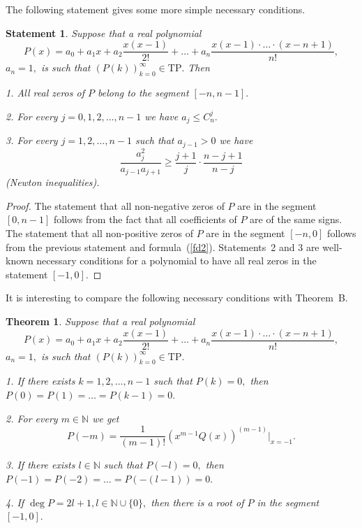 \documentclass[10pt,a4paper]{amsart}
\newcounter{count}
\numberwithin{count}{section}
\newtheorem{Theorem}[count]{Theorem}
\newtheorem{Statement}[count]{Statement}
\begin{document}
The following statement gives some more simple necessary conditions.

\begin{Statement}
\label{st1}
Suppose that a real polynomial 
$$P(x)= a_0 + a_1 x +a_2 \frac{x(x-1)}{2!} 
+  \ldots +a_n \frac{x(x-1)\cdot \ldots \cdot (x-n+1)}{n!},$$
$a_n=1, $   is such that $(P(k))_{k=0}^\infty \in \mathrm{TP}.$ Then

1. All real zeros of $P$ belong to the segment $[- n, n-1].$

2. For every $j=0, 1, 2, \ldots, n-1$ we have $a_j \leq C_n^j.$

3. For every $j= 1, 2, \ldots, n-1$ such that $a_{j-1}>0$  we have
$$\frac{a_j^2}{a_{j-1}a_{j+1}} \geq \frac{j+1}{j} \cdot \frac{n-j+1}{n-j}$$
(Newton inequalities).

\end{Statement}

\begin{proof}

The statement that all non-negative zeros of $P$ are in the segment $[0, n-1]$
follows from the fact that all coefficients of $P$ are of the same signs.
The statement that all non-positive zeros of $P$ are in the segment $[-n, 0]$
follows from the previous statement and formula~(\ref{fd2}). Statements~2 and 3
are well-known necessary conditions for a polynomial to have all real zeros
in the statement $[-1, 0].$
\end{proof}

It is interesting to compare the following necessary conditions with Theorem~B.


\begin{Theorem}
\label{th1}
Suppose that a real polynomial 
$$P(x)= a_0 + a_1 x +a_2 \frac{x(x-1)}{2!} 
+  \ldots +a_n \frac{x(x-1)\cdot \ldots \cdot (x-n+1)}{n!},$$
$a_n=1, $   is such that $(P(k))_{k=0}^\infty \in \mathrm{TP}.$ 

1. If there exists $k=1, 2, \ldots, n-1$ such that $P(k)=0,$ then
$P(0) = P(1) = \ldots = P(k-1)=0.$

2.  For every $m\in \mathbb{N}$ we get
\begin{equation}
\label{f110}
P(- m) = \frac{1}{(m-1)!}  \left(x^{m-1} Q(x)\right)^{(m-1)}|_{x=-1}.
\end{equation}

3.  If there exists $l \in \mathbb{N}$ such that $P(-l)=0,$ then
$P(-1) = P(-2) = \ldots = P(-(l-1))=0.$

4. If $\deg P = 2l+1, l \in \mathbb{N}\cup \{0\},$  then there is a root of
$P$ in the segment $[-1, 0].$

\end{Theorem}
\end{document}
